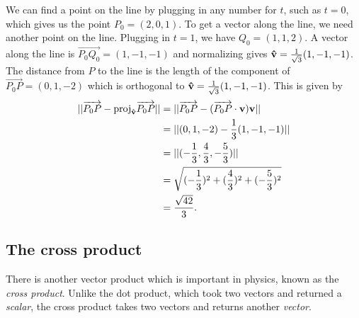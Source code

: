 \documentclass[12pt,letterpaper,reqno]{article}
\numberwithin{equation}{section}
\newcommand{\ti}[1]{\textit{#1}}
\begin{document}
{\color{red} 
We can find a point on the line by plugging in any number for $t$, such as $t=0$, which gives us the point $P_0=(2,0,1)$. To get a vector along the line, we need another point on the line. Plugging in $t=1$, we have $Q_0=(1,1,2)$. A vector along the line is $\overrightarrow{P_0Q_0}=(1,-1,-1)$ and normalizing gives ${\bf \hat{v}}=\frac{1}{\sqrt{3}}(1,-1,-1)$. The distance from $P$ to the line is the length of the component of $\overrightarrow{P_0P}=(0,1,-2)$ which is orthogonal to ${\bf \hat{v}}=\frac{1}{\sqrt{3}}(1,-1,-1)$. This is given by
\begin{align*}
	||\overrightarrow{P_0P}-\text{proj}_{\bf \hat{v}}\overrightarrow{P_0P}||&=||\overrightarrow{P_0P}-(\overrightarrow{P_0P} \cdot {\bf v}){\bf v}|| \\
	&=||(0,1,-2)-\frac{1}{3}(1,-1,-1)|| \\
	&=||(-\frac{1}{3},\frac{4}{3}, -\frac{5}{3})|| \\
	&=\sqrt{(-\frac{1}{3})^2+(\frac{4}{3})^2+(-\frac{5}{3})^2} \\
	&=\frac{\sqrt{42}}{3}.
\end{align*}}


\subsection{The cross product}
There is another vector product which is important in physics, known as the \ti{cross product}. Unlike the dot product, which took two vectors and returned a \ti{scalar}, the cross product takes two vectors and returns another \ti{vector}.
\end{document}
